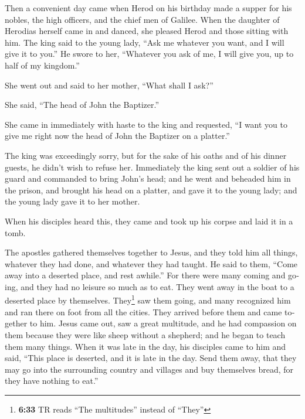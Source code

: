 \begin{paracol}{2}
\begin{otherlanguage}{english}
 Then a convenient day came when Herod on his birthday
made a supper for his nobles, the high officers, and the chief men of
Galilee.  When the daughter of Herodias herself came in
and danced, she pleased Herod and those sitting with him. The king said
to the young lady, ``Ask me whatever you want, and I will give it to
you.''  He swore to her, ``Whatever you ask of me, I will
give you, up to half of my kingdom.''

 She went out and said to her mother, ``What shall I
ask?''

She said, ``The head of John the Baptizer.''

 She came in immediately with haste to the king and
requested, ``I want you to give me right now the head of John the
Baptizer on a platter.''

 The king was exceedingly sorry, but for the sake of his
oaths and of his dinner guests, he didn't wish to refuse her.
 Immediately the king sent out a soldier of his guard and
commanded to bring John's head; and he went and beheaded him in the
prison,  and brought his head on a platter, and gave it
to the young lady; and the young lady gave it to her mother.

 When his disciples heard this, they came and took up his
corpse and laid it in a tomb.

 The apostles gathered themselves together to Jesus, and
they told him all things, whatever they had done, and whatever they had
taught.  He said to them, ``Come away into a deserted
place, and rest awhile.'' For there were many coming and going, and they
had no leisure so much as to eat.  They went away in the
boat to a deserted place by themselves.  They\footnote{\textbf{6:33}
  TR reads ``The multitudes'' instead of ``They''} saw them going, and
many recognized him and ran there on foot from all the cities. They
arrived before them and came together to him.  Jesus came
out, saw a great multitude, and he had compassion on them because they
were like sheep without a shepherd; and he began to teach them many
things.  When it was late in the day, his disciples came
to him and said, ``This place is deserted, and it is late in the day.
 Send them away, that they may go into the surrounding
country and villages and buy themselves bread, for they have nothing to
eat.''


\end{otherlanguage}
\end{paracol}
